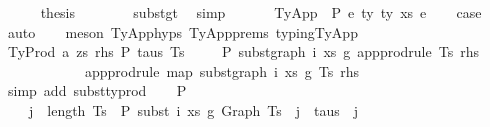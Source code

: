 \begin{isabellebody}
\isanewline
\ \ \ \ \isamarkupfalse%
\ {\isacharquery}{\kern0pt}thesis\isanewline
\ \ \ \ \ \ \isamarkupfalse%
\ subst{\isacharunderscore}{\kern0pt}gt\ \isamarkupfalse%
\ simp\isanewline
\ \ \isamarkupfalse%
\isanewline
{}\isamarkupfalse%
\isanewline
\ \ \isamarkupfalse%
\ {\isacharparenleft}{\kern0pt}TyApp\ {\isasymGamma}\ P\ e{}\ ty{}\ ty{}\ xs\ e{}{\isacharparenright}{\kern0pt}\isanewline
\ \ \isamarkupfalse%
\ {\isacharquery}{\kern0pt}case\isanewline
\ \ \isamarkupfalse%
\ auto\isanewline
\ \ \isamarkupfalse%
\ {\isacharparenleft}{\kern0pt}meson\ TyApp{\isachardot}{\kern0pt}hyps{\isacharparenleft}{\kern0pt}{}{\isacharcomma}{\kern0pt}{}{\isacharparenright}{\kern0pt}\ TyApp{\isachardot}{\kern0pt}prems{\isacharparenleft}{\kern0pt}{}{\isacharcomma}{\kern0pt}{}{\isacharcomma}{\kern0pt}{}{\isacharcomma}{\kern0pt}{}{\isacharcomma}{\kern0pt}{}{\isacharparenright}{\kern0pt}\ typing{\isachardot}{\kern0pt}TyApp{\isacharparenright}{\kern0pt}\isanewline
\isanewline
{}\isamarkupfalse%
\isanewline
\ \ \isamarkupfalse%
\ {\isacharparenleft}{\kern0pt}TyProd\ a\ zs\ rhs\ P\ taus\ Ts\ {\isasymGamma}{\isacharparenright}{\kern0pt}\isanewline
\ \ \isamarkupfalse%
\ P{}{\isacharcolon}{\kern0pt}\ {\isachardoublequoteopen}subst{\isacharunderscore}{\kern0pt}graph\ i\ xs\ g{}\ {\isacharparenleft}{\kern0pt}app{\isacharunderscore}{\kern0pt}prodrule\ Ts\ rhs{\isacharparenright}{\kern0pt}\ {\isacharequal}{\kern0pt}\isanewline
\ \ \ \ \ \ \ \ \ \ \ \ app{\isacharunderscore}{\kern0pt}prodrule\ {\isacharparenleft}{\kern0pt}map\ {\isacharparenleft}{\kern0pt}subst{\isacharunderscore}{\kern0pt}graph\ i\ xs\ g{}{\isacharparenright}{\kern0pt}\ Ts{\isacharparenright}{\kern0pt}\ rhs{\isachardoublequoteclose}\isanewline
\ \ \ \ \ \ \isamarkupfalse%
\ {\isacharparenleft}{\kern0pt}simp\ add{\isacharcolon}{\kern0pt}\ subst{\isacharunderscore}{\kern0pt}typrod{\isacharparenright}{\kern0pt}\isanewline
\isanewline
\ \ \isamarkupfalse%
\ P{}{}{\isacharcolon}{\kern0pt}\isanewline
\ \ \ \ {\isachardoublequoteopen}{\isasymforall}j\ {\isacharless}{\kern0pt}\ length\ Ts{\isachardot}{\kern0pt}\ {\isasymGamma}{}\ {\isasymturnstile}{\isacharbraceleft}{\kern0pt}P{\isacharbraceright}{\kern0pt}\ subst\ i\ xs\ g{}\ {\isacharparenleft}{\kern0pt}Graph\ {\isacharparenleft}{\kern0pt}Ts\ {\isacharbang}{\kern0pt}\ j{\isacharparenright}{\kern0pt}{\isacharparenright}{\kern0pt}\ {\isacharcolon}{\kern0pt}\ taus\ {\isacharbang}{\kern0pt}\ j{\isachardoublequoteclose}\isanewline

\end{isabellebody}
